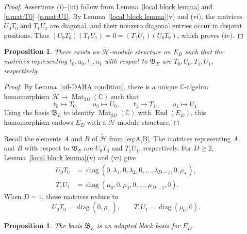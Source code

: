 \documentclass[reqno]{amsart}
\newtheorem{proposition}[theorem]{Proposition}
\theoremstyle{definition}
\begin{document}
\begin{proof}
%
Assertions (i)--(iii) follow from Lemma~\ref{local block lemma} and \eqref{e.mat:T0}--\eqref{e.mat:U1}.
By Lemma~\ref{local block lemma}(v) and (vi), the matrices $U_0T_0$ and
$T_1U_1$ are diagonal, and their nonzero diagonal entries occur in
disjoint positions. 
Thus
$(U_0T_0)(T_1U_1)=0=(T_1U_1)(U_0T_0)$, 
which proves (iv).
%
\end{proof}


\begin{proposition}\label{prop:E_D}
%
There exists an $\widetilde{\mathcal{H}}$-module structure on $E_D$ such that
the matrices representing $t_0,u_0,t_1,u_1$ with respect to
$\mathfrak{B}_E$ are $T_0,U_0,T_1,U_1$, respectively.
%
\end{proposition}

\begin{proof}
By Lemma~\ref{nil-DAHA condition}, there is a unique
$\mathbb{C}$-algebra homomorphism $\widetilde{\mathcal{H}}\rightarrow
\operatorname{Mat}_{2D}(\mathbb{C})$
such that
$$
t_0 \mapsto T_0,\qquad
u_0  \mapsto U_0,\qquad
t_1  \mapsto T_1,\qquad
u_1 \mapsto U_1.
$$
Using the basis $\mathfrak{B}_E$ to identify
$\operatorname{Mat}_{2D}(\mathbb{C})$ with $\operatorname{End}(E_D)$,
this homomorphism endows $E_D$ with a
$\widetilde{\mathcal{H}}$-module structure.
\end{proof}


Recall the elements $A$ and $B$ of $\widetilde{\mathcal{H}}$ from \eqref{eq:A,B}.
The matrices representing $A$ and $B$ with respect to
$\mathfrak{B}_E$ are $U_0T_0$ and $T_1U_1$, respectively. 
For $D\geq 2$, Lemma~\ref{local block lemma}(v) and (vi) give
\begin{align}
U_0T_0 & = \operatorname{diag}
(0,\lambda_1,0,\lambda_2,0,\dots,\lambda_{D-1},0,\rho_+), \label{eq:mat.AB(1)}\\
T_1U_1 & = \operatorname{diag} \label{eq:mat.AB(2)}
(\mu_0,0,\mu_1,0,\dots,\mu_{D-1},0).
\end{align}
When $D=1$, these matrices reduce to
\begin{equation}\label{eq:mat.AB(3)}
U_0T_0=\operatorname{diag}(0,\rho_+),
\qquad
T_1U_1=\operatorname{diag}(\mu_0,0).
\end{equation}


\begin{proposition}\label{prop:E_D,abb}
%
The basis $\mathfrak{B}_E$ is an adapted block basis for $E_D$.
%
\end{proposition}
\end{document}
